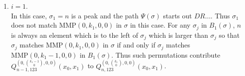 \documentclass[
final,nomarks
]{dmtcs-episciences}
\newcommand{\Qmzn}[3]{Q_{#3,123}^{(0,\binom{#1}{#2},0,0)}(x_0,x_1)}
\newcommand{\MMP}{\mathrm{MMP}}
\begin{document}
\begin{enumerate}[{\bf Case }\bf 1.]
	\item \begin{math}i=1\end{math}.\\
	In this case, \begin{math}\sigma_1=n\end{math} is a peak and the path \begin{math}\Psi(\sigma)\end{math} starts out \begin{math}DR \ldots \end{math}. Thus \begin{math}\sigma_1\end{math} does 
	not match \begin{math}\MMP(0,k_1,0,0)\end{math} in \begin{math}\sigma\end{math} in this case.  For any \begin{math}\sigma_j\end{math} in \begin{math}B_1(\sigma)\end{math}, \begin{math}n\end{math} is 
	always an element which is to the left of \begin{math}\sigma_j\end{math} which is larger than \begin{math}\sigma_j\end{math} so 
	that \begin{math}\sigma_j\end{math} matches  \begin{math}\MMP(0,k_1,0,0)\end{math} in \begin{math}\sigma\end{math} if and only if 
	\begin{math}\sigma_j\end{math} matches  \begin{math}\MMP(0,k_1-1,0,0)\end{math} in \begin{math}B_1(\sigma)\end{math}. Thus such permutations 
	contribute \\\begin{math}\Qmzn{k_1-1}{0}{n-1}\end{math} to \begin{math}\Qmzn{k_1}{0}{n}\end{math}.
	

\end{enumerate}
\end{document}
